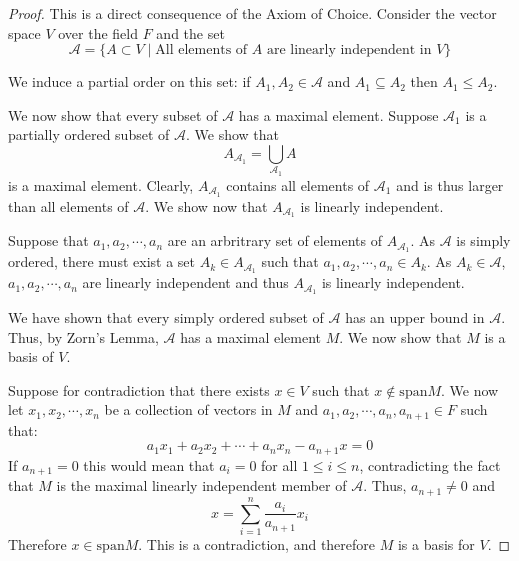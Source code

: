 \documentclass[a4paper]{report}
\begin{document}
\begin{proof}
  This is a direct consequence of the Axiom of Choice.
  Consider the vector space $V$ over the field $F$ and the set
  \[
    \mathcal{A} = \{A \subset V \mid \text{All elements of } A \text{ are linearly independent in } V \}    
  \]

  We induce a partial order on this set: if $A_1, A_2 \in \mathcal{A}$ and $A_1 \subseteq A_2$ then $A_1 \leq A_2$.

  We now show that every subset of $\mathcal{A}$ has a maximal element. Suppose $\mathcal{A}_1$ is a partially ordered subset of $\mathcal{A}$. We show that
\begin{equation*}
  A_{\mathcal{A}_1} = \bigcup_{\mathcal{A}_1}A
\end{equation*}
is a maximal element. Clearly, $A_{\mathcal{A}_1}$ contains all elements of $\mathcal{A}_1$ and is thus larger than all elements of $\mathcal{A}$. We show now that $A_{\mathcal{A}_1}$ is linearly independent.

Suppose that $a_1, a_2, \cdots, a_n$ are an arbritrary set of elements of $A_{\mathcal{A}_1}$. As $\mathcal{A}$ is simply ordered, there must exist a set $A_{k} \in A_{\mathcal{A}_1}$ such that $a_1, a_2, \cdots, a_n \in A_{k}$. As $A_k \in \mathcal{A}$, $a_1, a_2, \cdots, a_n$ are linearly independent and thus $A_{\mathcal{A}_1}$ is linearly independent.
        
        We have shown that every simply ordered subset of $\mathcal{A}$ has an upper bound in $\mathcal{A}$. Thus, by Zorn's Lemma, $\mathcal{A}$ has a maximal element $M$. We now show that $M$ is a basis of $V$.

  Suppose for contradiction that there exists $x \in V$ such that $x \notin \mathrm{span}M$. We now let $x_1, x_2, \cdots, x_n$ be a collection of vectors in $M$ and $a_1, a_2, \cdots, a_n, a_{n + 1} \in F$ such that:
  \[
    a_1x_1 + a_2x_2 + \cdots + a_nx_n - a_{n + 1}x = 0
  \]
  If $a_{n + 1}=0$ this would mean that $a_i = 0$ for all $1 \leq i \leq n$, contradicting the fact that $M$ is the maximal linearly independent member of $\mathcal{A}$. Thus,  $a_{n + 1}\neq 0$ and
  \[
    x = \sum_{i = 1}^n{\frac{a_i}{a_{n + 1}}x_i}    
  \]
  Therefore $x \in \mathrm{span}{M}$. This is a contradiction, and therefore $M$ is a basis for $V$.

\end{proof}



\end{document}
